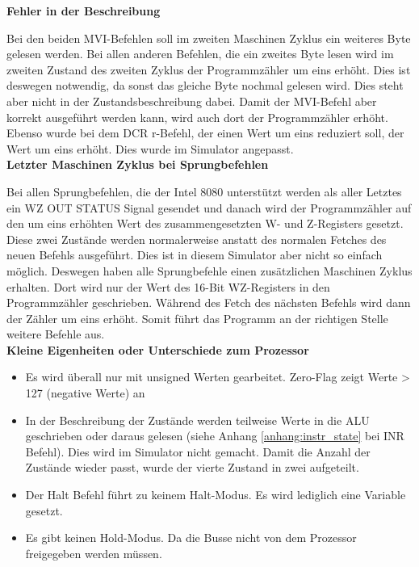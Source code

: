 \documentclass[12pt]{article}
\begin{document}
\noindent
\textbf{Fehler in der Beschreibung}

\noindent
Bei den beiden MVI-Befehlen soll im zweiten Maschinen Zyklus ein weiteres Byte gelesen werden. Bei allen anderen Befehlen, die ein zweites Byte lesen wird im zweiten Zustand des zweiten Zyklus der Programmzähler um eins erhöht. Dies ist deswegen notwendig, da sonst das gleiche Byte nochmal gelesen wird. Dies steht aber nicht in der Zustandsbeschreibung dabei. Damit der MVI-Befehl aber korrekt ausgeführt werden kann, wird auch dort der Programmzähler erhöht. Ebenso wurde bei dem DCR r-Befehl, der einen Wert um eins reduziert soll, der Wert um eins erhöht. Dies wurde im Simulator angepasst.
\\

\noindent
\textbf{Letzter Maschinen Zyklus bei Sprungbefehlen}

\noindent
Bei allen Sprungbefehlen, die der Intel 8080 unterstützt werden als aller Letztes ein WZ OUT STATUS Signal gesendet und danach wird der Programmzähler auf den um eins erhöhten Wert des zusammengesetzten W- und Z-Registers gesetzt. Diese zwei Zustände werden normalerweise anstatt des normalen Fetches des neuen Befehls ausgeführt. Dies ist in diesem Simulator aber nicht so einfach möglich. Deswegen haben alle Sprungbefehle einen zusätzlichen Maschinen Zyklus erhalten. Dort wird nur der Wert des 16-Bit WZ-Registers in den Programmzähler geschrieben. Während des Fetch des nächsten Befehls wird dann der Zähler um eins erhöht. Somit führt das Programm an der richtigen Stelle weitere Befehle aus.
\\

\noindent
\textbf{Kleine Eigenheiten oder Unterschiede zum Prozessor}

\noindent
\begin{itemize}
\item Es wird überall nur mit unsigned Werten gearbeitet. Zero-Flag zeigt Werte > 127 (negative Werte) an
\item In der Beschreibung der Zustände werden teilweise Werte in die ALU geschrieben oder daraus gelesen (siehe Anhang \ref{anhang:instr_state} bei INR Befehl). Dies wird im Simulator nicht gemacht. Damit die Anzahl der Zustände wieder passt, wurde der vierte Zustand in zwei aufgeteilt.
\item Der Halt Befehl führt zu keinem Halt-Modus. Es wird lediglich eine Variable gesetzt.
\item Es gibt keinen Hold-Modus. Da die Busse nicht von dem Prozessor freigegeben werden müssen.
\end{itemize}
\end{document}
